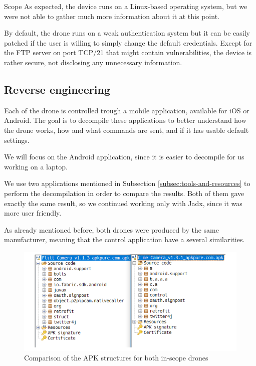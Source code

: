\begin{chaptercover}{Scope}
As expected, the device runs on a Linux-based operating system, but we were not able to gather much more information about it at this point.

\begin{tip}
By default, the drone runs on a weak authentication system but it can be easily patched if the user is willing to simply change the default credentials.
Except for the FTP server on port TCP/21 that might contain vulnerabilities, the device is rather secure, not disclosing any unnecessary information.
\end{tip}

\subsection{Reverse engineering}\label{subsec:reverse-engineering}

Each of the drone is controlled trough a mobile application, available for iOS or Android. The goal is to decompile these applications to better understand how the drone works, how and what commands are sent, and if it has usable default settings.

We will focus on the Android application, since it is easier to decompile for us working on a laptop. 

We use two applications mentioned in Subsection \ref{subsec:tools-and-resources} to perform the decompilation in order to compare the results. Both of them gave exactly the same result, so we continued working only with Jadx, since it was more user friendly.

As already mentioned before, both drones were produced by the same manufacturer, meaning that the control application have a several similarities.

\begin{figure}[H]
  \centering
  \includegraphics[width=\linewidth]{figures/apk-comparison}
  \caption{Comparison of the APK structures for both in-scope drones}
  \label{fig:apk-comparison}
\end{figure}


\end{chaptercover}
